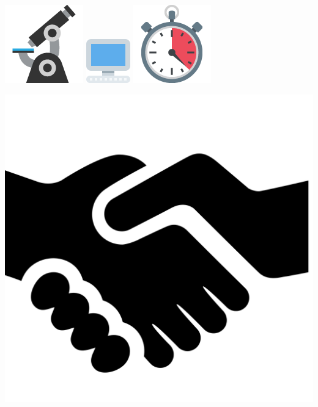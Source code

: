 \documentclass{beamer}
\begin{document}
\begin{frame}
    \centering
    \includegraphics[width=.19\textwidth]{static/examine} \hspace{.6cm}
    \includegraphics[width=.19\textwidth]{static/computer} \hspace{.6cm}
    \includegraphics[width=.19\textwidth]{static/train}
\end{frame}

\begin{frame}
    \centering
    \includegraphics[width=.6\textwidth]{static/hands}
\end{frame}
\end{document}
